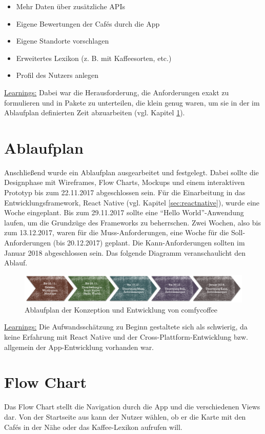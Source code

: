 \begin{itemize}
	\item Mehr Daten über zusätzliche APIs
	\item Eigene Bewertungen der Cafés durch die App
	\item Eigene Standorte vorschlagen
	\item Erweitertes Lexikon (z. B. mit Kaffeesorten, etc.)
	\item Profil des Nutzers anlegen
\end{itemize}

\underline{Learnings:}
Dabei war die Herausforderung, die Anforderungen exakt zu formulieren und in Pakete zu unterteilen, die klein genug waren, um sie in der im Ablaufplan definierten Zeit abzuarbeiten (vgl. Kapitel \ref{sec:ablaufplan}).

\section{Ablaufplan}
\label{sec:ablaufplan}
Anschließend wurde ein Ablaufplan ausgearbeitet und festgelegt. Dabei sollte die Designphase mit Wireframes, Flow Charts, Mockups und einem interaktiven Prototyp bis zum 22.11.2017 abgeschlossen sein. Für die Einarbeitung in das Entwicklungsframework, React Native (vgl. Kapitel \ref{sec:reactnative}), wurde eine Woche eingeplant. Bis zum 29.11.2017 sollte eine ``Hello World''-Anwendung laufen, um die Grundzüge des Frameworks zu beherrschen. Zwei Wochen, also bis zum 13.12.2017, waren für die Muss-Anforderungen, eine Woche für die Soll-Anforderungen (bis 20.12.2017) geplant. Die Kann-Anforderungen sollten im Januar 2018 abgeschlossen sein. Das folgende Diagramm veranschaulicht den Ablauf.

\begin{figure}[h!]
    \centering
		\includegraphics[width=\textwidth]{Bilder/ablaufplan.png}
		\caption{Ablaufplan der Konzeption und Entwicklung von comfycoffee}
\end{figure}

\underline{Learnings:}
Die Aufwandsschätzung zu Beginn gestaltete sich als schwierig, da keine Erfahrung mit React Native und der Cross-Plattform-Entwicklung bzw. allgemein der App-Entwicklung vorhanden war.

\section{Flow Chart}
Das Flow Chart stellt die Navigation durch die App und die verschiedenen Views dar. Von der Startseite aus kann der Nutzer wählen, ob er die Karte mit den Cafés in der Nähe oder das Kaffee-Lexikon aufrufen will.

